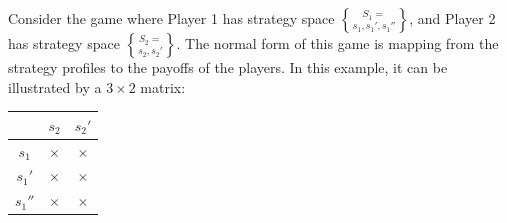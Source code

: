 Consider the game where Player 1 has strategy space $S_1 = \brace{s_1,s_1',s_1''}$, and Player 2 has strategy space $S_2 = \brace{s_2,s_2'}$. The normal form of this game is mapping from the strategy profiles to the payoffs of the players. In this example, it can be illustrated by a $3\times 2$ matrix:
\\

{\centering
\begin{tabular}{c|cc}
              & $s_2$ & $s_2'$ \\ \hline
            $s_1$ & $\times$ & $\times$ \\ 
            $s_1'$ & $\times$ & $\times$ \\
            $s_1''$ & $\times$ & $\times$
\end{tabular}\par
}

